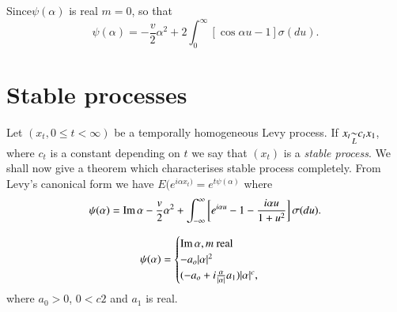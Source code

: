 Since\pageoriginale $\psi ( \alpha )$ is real $m=0$, so that 
$$
\psi(\alpha) = - \frac{v}{2}\alpha^2 + 2 \int_{0}^\infty [ \cos
  \alpha u -1] \sigma (du). 
$$

\section{Stable processes}\label{chap4-sec5} %

Let $(x_t , 0 \le t < \infty )$ be a temporally homogeneous Levy
process. If $x_t {\displaystyle{\mathop{\sim}_{L}}} c_t x_1$, where $c_t$ is a constant
depending on $t$ we say that $(x_t)$ is a \textit{stable process}. We
shall now give a theorem which characterises stable process
completely. From Levy's canonical form we have $E(e^{i \alpha x_t)} =
e^{ t \psi ( \alpha )}$ where  
$$
\psi(\alpha)  = \operatorname{Im} \alpha - \frac{v}{2} \alpha^2 + \int_{-
  \infty}^\infty \left[ e^{i \alpha u}-1- \frac{i \alpha u}{1+ u^2}\right]
\sigma (du). 
$$

\setcounter{thm}{0}
\begin{thm}\label{chap4-sec5-thm1} 
\begin{equation*}
    \psi ( \alpha ) = 
    \begin{cases}
      \operatorname{Im} \alpha, m \text{ real}\\
      - a_o |  \alpha |^2 \\
      ( - a_o +  i \frac{\alpha}{| \alpha |}a_1 ) | \alpha |^c ,
    \end{cases}
  \end{equation*}
  where $a_0 > 0$, $0 < c 2$ and $a_1$ is real.
\end{thm}

